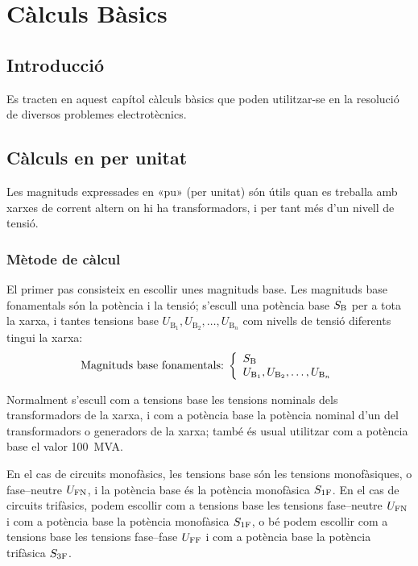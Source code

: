 \chapter{Càlculs Bàsics}\label{sec:calc_bas}

\section{Introducció}
Es tracten en aquest capítol càlculs bàsics que poden utilitzar-se en la
resolució de diversos problemes electrotècnics.



\section{Càlculs en per unitat} \label{sec:seccio_pu} 

Les magnituds expressades en «pu» (per unitat) són útils quan es treballa
amb xarxes de corrent altern on hi ha transformadors, i per tant més d'un nivell de tensió.

\subsection{Mètode de càlcul} 

 El primer pas consisteix en
escollir unes magnituds base. Les magnituds base fonamentals són la
potència i la tensió; s'escull una potència base $S_\mathrm{B}$ per a
tota la xarxa, i tantes tensions base $U_{\text{B}_1}, U_{\text{B}_2}, \ldots,
U_{\text{B}_n}$ com nivells de tensió
diferents tingui la xarxa:
\begin{equation}
   \text{Magnituds base fonamentals:}\;\left\{
\begin{array}{l}
   S_\mathrm{B} \\
   U_{\text{B}_1}, U_{\text{B}_2}, \ldots, U_{\text{B}_n}
\end{array}
\right.
\end{equation}

Normalment s'escull com a tensions base les tensions nominals dels transformadors de la
xarxa, i com a potència base la potència nominal d'un del transformadors o generadors de la xarxa; també és usual utilitzar com a potència base el valor \SI{100}{MVA}.

En el cas de circuits monofàsics, les tensions base són les tensions monofàsiques, o fase--neutre $U_\mathrm{FN}$, i la potència base és la potència monofàsica $S_\mathrm{1F}$. En el cas de circuits trifàsics, podem escollir com a tensions base les tensions fase--neutre $U_\mathrm{FN}$ i com a potència base la potència  monofàsica $S_\mathrm{1F}$, o bé podem escollir com a tensions base les tensions fase--fase $U_\mathrm{FF}$ i com a potència base la potència trifàsica $S_\mathrm{3F}$.

